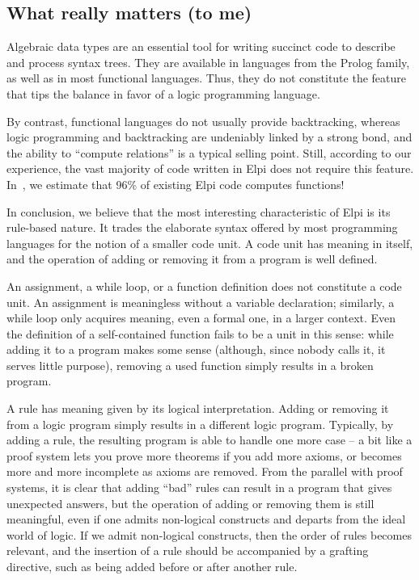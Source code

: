 \documentclass[a4paper, 11pt]{book}
\begin{document}
\subsection{What really matters (to me)}


Algebraic data types are an essential tool for writing succinct code to
describe and process syntax trees. They are available in languages from the
Prolog family, as well as in most functional languages. Thus, they do not
constitute the feature that tips the balance in favor of a logic programming
language.

By contrast, functional languages do not usually provide backtracking, whereas
logic programming and backtracking are undeniably linked by a strong bond, and
the ability to ``compute relations'' is a typical selling point. Still,
according to our experience, the vast majority of code written in Elpi does
not require this feature. In~\cite{elpidet}, we estimate that 96\% of existing
Elpi code computes functions!

In conclusion, we believe that the most interesting characteristic of Elpi is
its rule-based nature. It trades the elaborate syntax offered by most
programming languages for the notion of a smaller code unit. A code unit has
meaning in itself, and the operation of adding or removing it from a program
is well defined.

An assignment, a while loop, or a function definition does not constitute a
code unit. An assignment is meaningless without a variable declaration;
similarly, a while loop only acquires meaning, even a formal one, in a larger
context. Even the definition of a self-contained function fails to be a unit
in this sense: while adding it to a program makes some sense (although, since
nobody calls it, it serves little purpose), removing a used function simply
results in a broken program.

A rule has meaning given by its logical interpretation. Adding or removing it
from a logic program simply results in a different logic program. Typically,
by adding a rule, the resulting program is able to handle one more case -- a bit
like a proof system lets you prove more theorems if you add more axioms, or
becomes more and more incomplete as axioms are removed. From the parallel
with proof systems, it is clear that adding ``bad'' rules can result in a
program that gives unexpected answers, but the operation of adding or removing
them is still meaningful, even if one admits non-logical constructs and
departs from the ideal world of logic. If we admit non-logical constructs,
then the order of rules becomes relevant, and the insertion of a rule should
be accompanied by a grafting directive, such as being added before or after
another rule.
\end{document}

